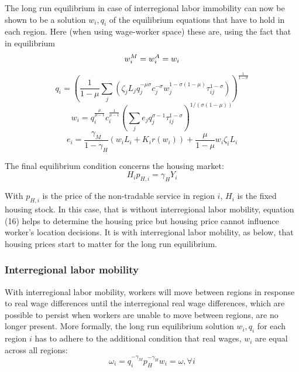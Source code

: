 \documentclass[twocolumn]{article}
\begin{document}
The long run equilibrium in case of interregional labor immobility can now be shown to be a solution ${w_i,q_i}$ of the equilibrium equations that have to hold in each region. Here (when using wage-worker space) these are, using the fact that in equilibrium 
\begin{equation}
    \notag
    w_i^M = w_i^A = w_i
\end{equation}

\begin{equation}
    q_{i}=(\frac{1}{1-\mu} \sum_{j}\left(\zeta_{j} L_{j} q_{j}^{-\mu \sigma} c_{j}^{-\sigma} w_{j}^{1-\sigma(1-\mu)} \tau_{i j}^{1-\sigma}\right))^{\frac{1}{1-\sigma}}
\end{equation}
\begin{equation}
    w_{i}=q_{i}^{\frac{\mu}{\mu-1}} c_{i}^{\frac{1}{\mu-1}}(\sum_{j} e_{j} q_{j}^{\sigma-1} \tau_{i j}^{1-\sigma})^{1 /(\sigma(1-\mu))}
\end{equation}
\begin{equation}
    e_{i}=\frac{\gamma_{M}}{1-\gamma_{H}}(w_{i} L_{i}+K_{i} r(w_{i}))+\frac{\mu}{1-\mu} w_{i} \zeta_{i} L_{i}
\end{equation}

The final equilibrium condition concerns the housing market:
\begin{equation}
    H_ip_{H,i}=\gamma_HY_i
\end{equation}

With $p_{H,i}$ is the price of the non-tradable service in region $i$, $H_i$ is the fixed housing stock. In this case, that is without interregional labor mobility, equation (16) helps to determine the housing price but housing price cannot influence worker's location decisions. It is with interregional labor mobility, as below, that housing prices start to matter for the long run equilibrium.

\subsubsection{Interregional labor mobility}

With interregional labor mobility, workers will move between regions in response to real wage differences until the interregional real wage differences, which are possible to persist when workers are unable to move between regions, are no longer present. More formally, the long run equilibrium solution ${w_i,q_i}$ for each region $i$ has to adhere to the additional condition that real wages, $w_i$ are equal across all regions:
\begin{equation}
    \omega_i = q_i^{-\gamma_M}p_H^{-\gamma_H}w_i = \omega, \forall i
\end{equation}
\end{document}
